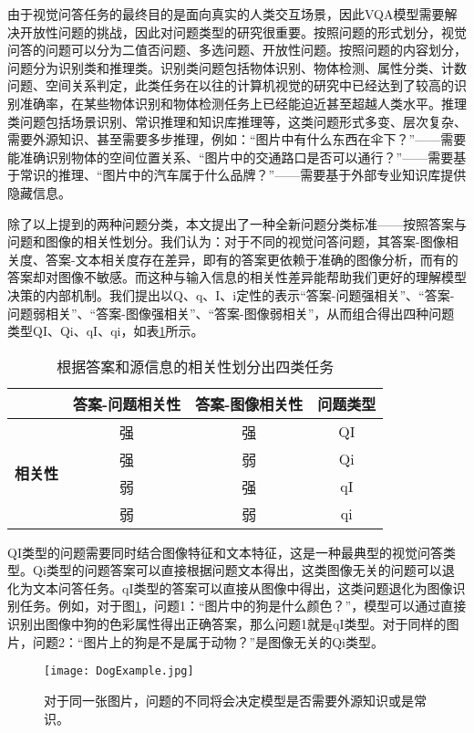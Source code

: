 由于视觉问答任务的最终目的是面向真实的人类交互场景，因此VQA模型需要解决开放性问题的挑战，因此对问题类型的研究很重要。按照问题的形式划分，视觉问答的问题可以分为二值否问题、多选问题、开放性问题。按照问题的内容划分，问题分为识别类和推理类。识别类问题包括物体识别、物体检测、属性分类、计数问题、空间关系判定，此类任务在以往的计算机视觉的研究中已经达到了较高的识别准确率，在某些物体识别和物体检测任务上已经能迫近甚至超越人类水平。推理类问题包括场景识别、常识推理和知识库推理等，这类问题形式多变、层次复杂、需要外源知识、甚至需要多步推理，例如：“图片中有什么东西在伞下？”——需要能准确识别物体的空间位置关系、“图片中的交通路口是否可以通行？”——需要基于常识的推理、“图片中的汽车属于什么品牌？”——需要基于外部专业知识库提供隐藏信息。

除了以上提到的两种问题分类，本文提出了一种全新问题分类标准——按照答案与问题和图像的相关性划分。我们认为：对于不同的视觉问答问题，其答案-图像相关度、答案-文本相关度存在差异，即有的答案更依赖于准确的图像分析，而有的答案却对图像不敏感。而这种与输入信息的相关性差异能帮助我们更好的理解模型决策的内部机制。我们提出以Q、q、I、i定性的表示“答案-问题强相关”、“答案-问题弱相关”、“答案-图像强相关”、“答案-图像弱相关”，从而组合得出四种问题类型QI、Qi、qI、qi，如表\ref{ques_type}所示。
\begin{table}[H]
\centering
\caption{根据答案和源信息的相关性划分出四类任务}
\begin{tabular*}{0.9\textwidth}{@{\extracolsep{\fill}}lccc}
\toprule
& \textbf{答案-问题相关性} & \textbf{答案-图像相关性} & \textbf{问题类型} \\
\midrule
\multirow{4}{*}{\textbf{相关性}} &  强& 强&  QI\\
&  强& 弱&  Qi\\
&  弱& 强&  qI\\
&  弱& 弱&  qi\\
\bottomrule
\end{tabular*}
\label{ques_type}
\end{table}

QI类型的问题需要同时结合图像特征和文本特征，这是一种最典型的视觉问答类型。Qi类型的问题答案可以直接根据问题文本得出，这类图像无关的问题可以退化为文本问答任务。qI类型的答案可以直接从图像中得出，这类问题退化为图像识别任务。例如，对于图\ref{DogExample}，问题1：“图片中的狗是什么颜色？”，模型可以通过直接识别出图像中狗的色彩属性得出正确答案，那么问题1就是qI类型。对于同样的图片，问题2：“图片上的狗是不是属于动物？”是图像无关的Qi类型。
\begin{figure}[H]
	\texttt{[image: DogExample.jpg]}
	\caption{对于同一张图片，问题的不同将会决定模型是否需要外源知识或是常识。}
	\label{DogExample}
\end{figure}

